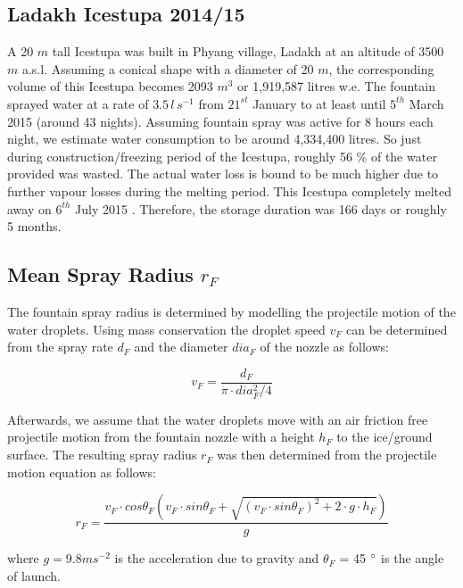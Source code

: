 \documentclass[utf8]{frontiersSCNS} %
\begin{document}
\subsection{Ladakh Icestupa 2014/15} \label{section:ladakhloss} A 20 $m$ tall Icestupa \citep{iceheight} was built in
Phyang village, Ladakh at an altitude of 3500 $m$ a.s.l. Assuming a conical shape with a diameter of 20 $m$, the
corresponding volume of this Icestupa becomes 2093 $m^3$ or 1,919,587 litres w.e. The fountain sprayed water at a rate
of $3.5\, l\,s^{-1}$ \citep{waterinput} from $21^{st}$ January \citep{waterstart} to at least until $5^{th}$ March 2015
\citep{waterend} (around 43 nights). Assuming fountain spray was active for 8 hours each night, we estimate water
consumption to be around 4,334,400 litres. So just during construction/freezing period of the Icestupa, roughly 56 \% of
the water provided was wasted. The actual water loss is bound to be much higher due to further vapour losses during the
melting period. This Icestupa completely melted away on $6^{th}$ July 2015 \citep{iceends}. Therefore, the storage
duration was 166 days or roughly 5 months. 

\subsection{Mean Spray Radius $r_F$} \label{section:rF}

The fountain spray radius is determined by modelling the projectile motion of the water droplets. Using mass
conservation the droplet speed $v_F$ can be determined from the spray rate $d_F$ and the diameter $dia_F$ of the nozzle
as follows:

\begin{equation} v_F = \frac{d_F}{\pi \cdot dia_F^2/4} \end{equation}

Afterwards, we assume that the water droplets move with an air friction free projectile motion from the fountain nozzle
with a height $h_F$ to the ice/ground surface. The resulting spray radius $r_F$ was then determined from the projectile
motion equation as follows:

\begin{equation} r_F = \frac{v_F \cdot cos\theta_F (v_F \cdot sin\theta_F + \sqrt{(v_F \cdot sin\theta_F)^{2} + 2 \cdot
g \cdot h_F})}{g} \end{equation}

where $g = 9.8 m s^{-2}$ is the acceleration due to gravity and $\theta_F$ = 45 $\degree$ is the angle of launch.
\end{document}

